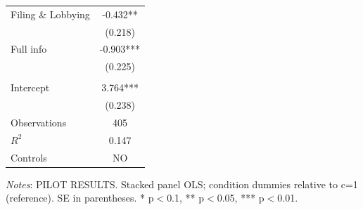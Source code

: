 \documentclass[11pt]{article}
\begin{document}
\begin{table}[!htbp]
\begin{threeparttable}
\begin{tabular}{l|c}
Filing \& Lobbying & -0.432** \\
 & (0.218) \\
Full info & -0.903*** \\
 & (0.225) \\
\\[0.5em]
Intercept & 3.764*** \\
 & (0.238) \\
\midrule
Observations & 405 \\
$R^2$ & 0.147 \\
Controls & NO \\
\bottomrule
\end{tabular}
\begin{tablenotes}[flushleft]
\footnotesize
\item \textit{Notes}: PILOT RESULTS. Stacked panel OLS; condition dummies relative to c=1 (reference). SE in parentheses. * p$<$0.1, ** p$<$0.05, *** p$<$0.01.
\end{tablenotes}
\end{threeparttable}
\end{table}
\end{document}
